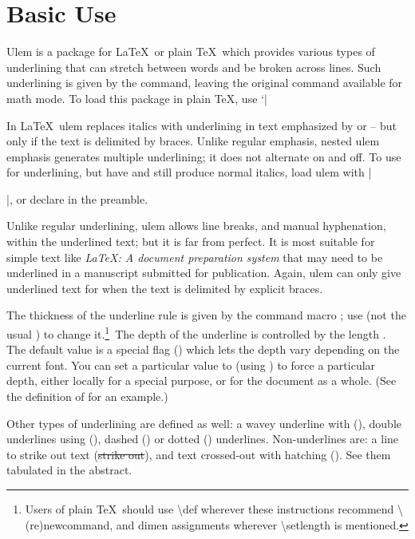 \documentclass[12pt]{ltxdoc}
\begin{document}
\section{Basic Use}
\tradini
Ulem is a package for \LaTeX\ or plain \TeX\ which provides various types of
underlining that can stretch between words and be broken across lines.
Such underlining is given by the  command, leaving the original
 command available for math mode.
To load this package in plain \TeX, use `|

In \LaTeX\ ulem replaces italics with underlining in text emphasized
by  or  -- but only if the text is delimited by 
braces.  Unlike regular  emphasis, nested ulem emphasis generates
multiple underlining; it does not alternate on and off.
To use  for underlining, but have  and  still 
produce normal italics, load ulem with |\usepackage[normalem]{ulem}|, 
or declare  in the preamble.

Unlike regular underlining, ulem allows line breaks, and manual
hyphenation, within the underlined text; but it is far from perfect. It is
most suitable for simple text like {\em \LaTeX: A document preparation
system\/}  that may need to be underlined in a manuscript submitted for
publication.  Again, ulem can only give underlined text for  when 
the text is delimited by explicit braces.

The thickness of the underline rule is given by the command macro
; use  (not the usual 
) to change it.\footnote
{Users of plain \TeX\ should use \textbackslash def wherever these
instructions recommend \textbackslash(re)newcommand, and dimen
assignments wherever \textbackslash setlength is mentioned.}\,
The depth of the underline is controlled 
by the length .  The default value is a special flag 
() which lets the depth vary depending on the current font.
You can set a particular value to  (using ) to 
force a particular depth, either locally for a special purpose, or 
for the document as a whole.  (See the definition of  for an
example.)

Other types of underlining are defined as well:
a wavey underline with  (), double underlines 
using  (), dashed 
() or dotted  () underlines.  Non-underlines are: a line to strike out text 
(\sout{strike out}), and text crossed-out with hatching  
().  See them tabulated in the abstract.
\end{document}

